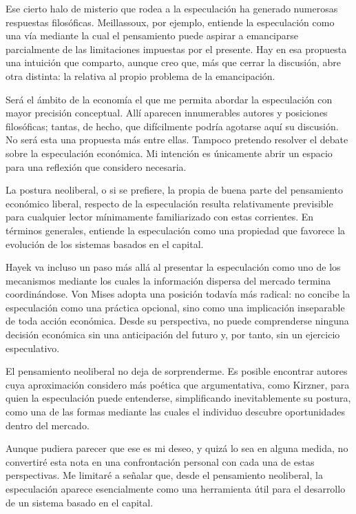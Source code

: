 \documentclass[12pt,a4paper]{article}
\begin{document}
Ese cierto halo de misterio que rodea a la especulación ha generado numerosas respuestas filosóficas. Meillassoux, por ejemplo, entiende la especulación como una vía mediante la cual el pensamiento puede aspirar a emanciparse parcialmente de las limitaciones impuestas por el presente. Hay en esa propuesta una intuición que comparto, aunque creo que, más que cerrar la discusión, abre otra distinta: la relativa al propio problema de la emancipación.

Será el ámbito de la economía el que me permita abordar la especulación con mayor precisión conceptual. Allí aparecen innumerables autores y posiciones filosóficas; tantas, de hecho, que difícilmente podría agotarse aquí su discusión. No será esta una propuesta más entre ellas. Tampoco pretendo resolver el debate sobre la especulación económica. Mi intención es únicamente abrir un espacio para una reflexión que considero necesaria.

La postura neoliberal, o si se prefiere, la propia de buena parte del pensamiento económico liberal, respecto de la especulación resulta relativamente previsible para cualquier lector mínimamente familiarizado con estas corrientes. En términos generales, entiende la especulación como una propiedad que favorece la evolución de los sistemas basados en el capital.

Hayek va incluso un paso más allá al presentar la especulación como uno de los mecanismos mediante los cuales la información dispersa del mercado termina coordinándose. Von Mises adopta una posición todavía más radical: no concibe la especulación como una práctica opcional, sino como una implicación inseparable de toda acción económica. Desde su perspectiva, no puede comprenderse ninguna decisión económica sin una anticipación del futuro y, por tanto, sin un ejercicio especulativo.

El pensamiento neoliberal no deja de sorprenderme. Es posible encontrar autores cuya aproximación considero más poética que argumentativa, como Kirzner, para quien la especulación puede entenderse, simplificando inevitablemente su postura, como una de las formas mediante las cuales el individuo descubre oportunidades dentro del mercado.

Aunque pudiera parecer que ese es mi deseo, y quizá lo sea en alguna medida, no convertiré esta nota en una confrontación personal con cada una de estas perspectivas. Me limitaré a señalar que, desde el pensamiento neoliberal, la especulación aparece esencialmente como una herramienta útil para el desarrollo de un sistema basado en el capital.
\end{document}

